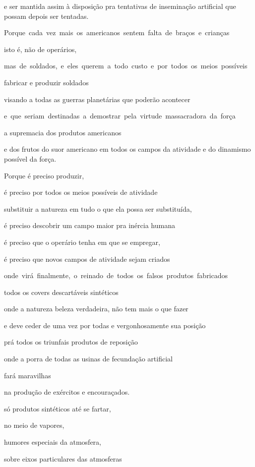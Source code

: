 e ser mantida assim à disposição pra tentativas de inseminação
artificial que possam depois ser tentadas.


\mbox{Porque cada vez mais os americanos sentem falta de braços e crianças}

isto é, não de operários, 

\mbox{mas de soldados, e eles querem a todo custo e por todos os meios possíveis}

fabricar e produzir soldados

visando a todas as guerras planetárias que poderão acontecer

\mbox{e que seriam destinadas a demostrar pela virtude massacradora da força}

a supremacia dos produtos americanos

e dos frutos do suor americano em todos os campos da atividade e do
dinamismo possível da força.

Porque é preciso produzir, 

é preciso por todos os meios possíveis de atividade

substituir a natureza em tudo o que ela possa ser substituída,

é preciso descobrir um campo maior pra inércia humana

é preciso que o operário tenha em que se empregar,

é preciso que novos campos de atividade sejam criados

\mbox{onde virá finalmente, o reinado de todos os falsos produtos fabricados}

todos os covers descartáveis sintéticos

onde a natureza beleza verdadeira, não tem mais o que fazer

e deve ceder de uma vez por todas e vergonhosamente sua posição

prá todos os triunfais produtos de reposição

onde a porra de todas as usinas de fecundação artificial

fará maravilhas

na produção de exércitos e encouraçados.

só produtos sintéticos até se fartar, 

no meio de vapores,

humores especiais da atmosfera, 

sobre eixos particulares das atmosferas


